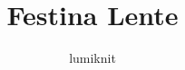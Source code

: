 \documentclass{article}
\title{Festina Lente}
\author{lumiknit}
\begin{document}
\maketitle
\begin{multicols}{3}
\end{multicols}
\end{document}
